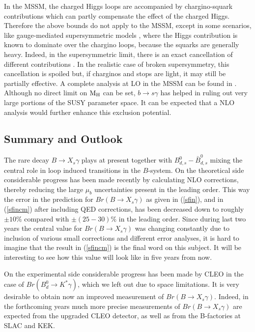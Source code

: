 In the MSSM, the charged Higgs loops are accompanied by chargino-squark 
contributions which can partly compensate the
effect of the charged Higgs. Therefore the above bounds do not apply to the
MSSM, except in some scenarios, like gauge-mediated supersymmetric models 
\cite{rattazzi}, where the Higgs contribution is known to dominate over the
chargino loops, because the squarks are generally heavy.
 Indeed, in the supersymmetric limit, there
is an exact cancellation of different contributions \cite{io}. In the
realistic case of broken supersymmetry, this cancellation is spoiled but,
if charginos and stops are light, it may still be partially effective.
A complete analysis at LO in the MSSM can be found in 
\cite{berto}. Although no direct limit on ${\rm M_H}$ 
can be set, $b\to s\gamma$ has
helped in ruling out very large portions of the SUSY parameter space.
It can be expected that a NLO analysis would further enhance  this 
exclusion potential.
\subsection{Summary and Outlook}
The rare decay $B\to X_s\gamma$ plays at present together with
$B^0_{d,s}-\bar B^0_{d,s}$ mixing the central role
in loop induced transitions in the $B$-system. On the theoretical
side considerable progress has been made recently by calculating
NLO corrections, thereby reducing the large $\mu_b$ uncertainties
present in the leading order. This way the error in the
prediction for $Br(B\to X_s\gamma)$ as
given in (\ref{sfin}), and in  (\ref{sfincm}) 
after including QED corrections, 
has been decreased down to roughly
$\pm 10\%$ compared with $\pm (25-30)\%$ in the leading order.
Since during last two years the central value for 
$Br(B\to X_s\gamma)$ was changing constantly due to inclusion
of various small corrections and different error analyses, 
it is hard to imagine that the
result in  (\ref{sfincm}) is the final word
on this subject. It will be interesting to see how this value
will look like in five years from now. 

On the experimental side considerable progress has been made
by CLEO \cite{CLEO96} in the case of $Br (B^0_d\to K^*\gamma)$, which
we left out due to space limitations.
 It is very
desirable to obtain now an improved measurement of 
$Br(B\to X_s\gamma)$.
Indeed,
in the forthcoming years much more
precise measurements of $Br(B{\to}X_s \gamma)$ are expected from the
upgraded CLEO detector, as well as from the B-factories at SLAC and KEK.


